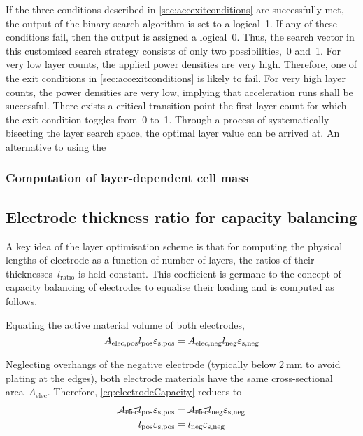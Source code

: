 If   the  three   conditions  described   in  \cref{sec:accexitconditions}   are
successfully  met,  the output  of  the  binary search  algorithm  is  set to  a
logical~1.  If any  of these  conditions  fail, then  the output  is assigned  a
logical~0. Thus, the  search vector in this customised  search strategy consists
of  only two  possibilities,~0 and~1.  For very  low layer  counts, the  applied
power  densities  are very  high.  Therefore,  one  of  the exit  conditions  in
\cref{sec:accexitconditions} is likely to fail.  For very high layer counts, the
power  densities  are  very  low,  implying  that  acceleration  runs  shall  be
successful.  There exists  a critical  transition point  \viz{} the  first layer
count for  which the exit  condition toggles from~0  to~1. Through a  process of
systematically bisecting the layer search space, the optimal layer value can be
arrived at. An alternative to using the

\subsubsection*{\hypertarget{href:layerdependentcellmass}{Computation of layer-dependent cell mass}}\label{sec:massofonecell}

\subsection{Electrode thickness ratio for capacity balancing}\label{sec:electroderatio}

A key  idea of the layer  optimisation scheme is that  for computing the
physical  lengths  of electrode  as  a  function  of number  of  layers,
the  ratios  of  their thicknesses~$l_\text{ratio}$  is  held  constant.
This  coefficient is  germane to  the concept  of capacity  balancing of
electrodes  to equalise  their loading and is computed as follows.

Equating  the active material volume of both electrodes,
\begin{equation}
    A_\text{elec,pos}l_\text{pos}  \varepsilon_\text{s,pos} = A_\text{elec,neg}l_\text{neg}  \varepsilon_\text{s,neg} \label{eq:electrodeCapacity}\\
\end{equation}

Neglecting  overhangs   of  the  negative  electrode   (typically  below
$\SI{2}{\milli\meter}$ to  avoid plating  at the edges),  both electrode
materials have the same cross-sectional area~$A_\text{elec}$. Therefore,
\cref{eq:electrodeCapacity} reduces to
\begin{align}
    \cancel{A_\text{elec}}l_\text{pos}  \varepsilon_\text{s,pos} & = \cancel{A_\text{elec}}l_\text{neg}  \varepsilon_\text{s,neg}  \\
    l_\text{pos}  \varepsilon_\text{s,pos}                       & = l_\text{neg}  \varepsilon_\text{s,neg}\label{eq:electrodeCapequalarea}
\end{align}

